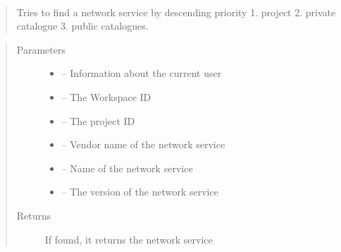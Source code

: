 \documentclass[letterpaper,10pt,english]{sphinxmanual}
\begin{document}

\begin{fulllineitems}
\label{_source/son_editor.impl:son_editor.impl.nsfslookupimpl.find_network_service}~\begin{quote}

Tries to find a network service by descending priority
1. project
2. private catalogue
3. public catalogues.
\end{quote}
\begin{quote}\begin{description}
\item[{Parameters}] \leavevmode\begin{itemize}
\item {} 
 -- Information about the current user

\item {} 
 -- The Workspace ID

\item {} 
 -- The project ID

\item {} 
 -- Vendor name of the network service

\item {} 
 -- Name of the network service

\item {} 
 -- The   version of the network service

\end{itemize}

\item[{Returns}] \leavevmode
If found, it returns the network service

\end{description}\end{quote}

\end{fulllineitems}

\end{document}
